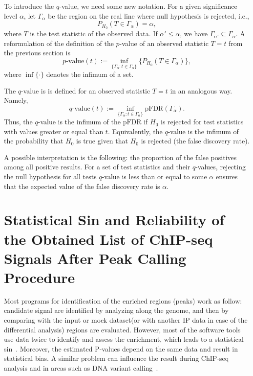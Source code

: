 To introduce the $q$-value, we need some new notation.
For a given significance level $\alpha$, let $\Gamma_\alpha$ be the region on the real line where null hypothesis is rejected, i.e.,
$$P_{H_0}(T \in \Gamma_\alpha) = \alpha,$$
where $T$ is the test statistic of the observed data.
If $\alpha' \leq \alpha$, we have $\Gamma_{\alpha'} \subseteq \Gamma_\alpha$.
A reformulation of the definition of the $p$-value of an observed statistic $T = t$ from the previous section is
$$\text{$p$-value}(t) := \inf_{\{\Gamma_\alpha : t \in \Gamma_\alpha\}}\{P_{H_0}(T \in \Gamma_\alpha)\},$$
where $\inf\{\cdot\}$ denotes the infimum of a set.

The $q$-value is is defined for an observed statistic $T = t$ in an analogous way.
Namely,
$$\text{$q$-value}(t) := \inf_{\{\Gamma_\alpha : t \in \Gamma_\alpha\}}\text{pFDR}(\Gamma_\alpha).$$
Thus, the $q$-value is the infimum of the $\text{pFDR}$ if $H_0$ is rejected for test statistics with values greater or equal than $t$.
Equivalently, the $q$-value is the infimum of the probability that $H_0$ is true given that $H_0$ is rejected (the false discovery rate).

A possible interpretation is the following: the proportion of the false positives among all positive results.
For a set of test statistics and their $q$-values, rejecting the null hypothesis for all tests $q$-value is less than or equal to some $\alpha$ ensures that the expected value of the false discovery rate is $\alpha$.












\section{Statistical Sin and Reliability of the Obtained List of ChIP-seq Signals After Peak Calling Procedure}

Most programs for identification of the enriched regions (peaks) work as follow: candidate signal are identified by analyzing along the genome, and then by comparing with the input or mock dataset(or with another IP data in case of the differential analysis) regions are evaluated. 
However, most of the software tools use data twice to identify and assess the enrichment, which leads to a statistical sin~\cite{lun2014novo}. 
Moreover, the estimated P-values depend on the same data and result in statistical bias.
A similar problem can influence the result during ChIP-seq analysis and in areas such as DNA variant calling~\cite{chitpin2019recap}.

